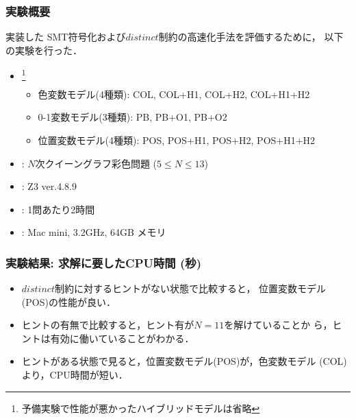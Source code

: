 \documentclass [dvipdfmx,11pt]{beamer}
\newcommand{\distinct}{$distinct$}
\begin{document}
\begin{frame}\frametitle{実験概要}
  実装した SMT符号化および{\distinct}制約の高速化手法を評価するために，
  以下の実験を行った．
  \bigskip
  \begin{itemize}
  \item {}\footnote{%
    予備実験で性能が悪かったハイブリッドモデルは省略}
    \begin{itemize}
    \item 色変数モデル(4種類): COL, COL+H1, COL+H2, COL+H1+H2
    \item 0-1変数モデル(3種類): PB, PB+O1, PB+O2
    \item 位置変数モデル(4種類): POS, POS+H1, POS+H2, POS+H1+H2
    \end{itemize}
  \item {}: $N$次クイーングラフ彩色問題 ($5\leq N\leq 13$)
  \item {}: Z3 ver.4.8.9
  \item {}: 1問あたり2時間
  \item {}: Mac mini, 3.2GHz, 64GB メモリ
  \end{itemize}
\end{frame}
\begin{frame}
  \frametitle{実験結果: 求解に要したCPU時間 (秒)}
  \begin{block}{}\centering
    {\tiny }
  \end{block}
  \begin{itemize}
  \item {\distinct}制約に対するヒントがない状態で比較すると，
    位置変数モデル(POS)の性能が良い．
  \item ヒントの有無で比較すると，ヒント有が$N=11$を解けていることか
    ら，ヒントは有効に働いていることがわかる．
  \item ヒントがある状態で見ると，位置変数モデル(POS)が，色変数モデル
    (COL)より，CPU時間が短い．
  \end{itemize}
\end{frame}
\end{document}
